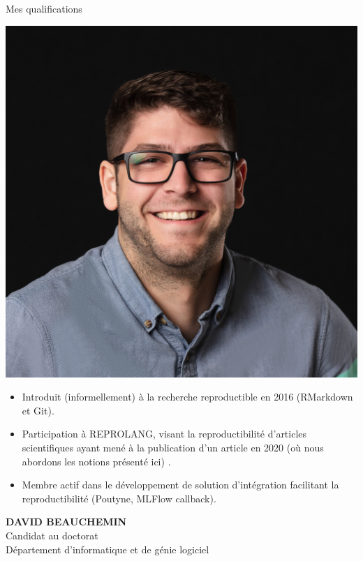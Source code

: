 \documentclass{beamer}
\begin{document}
	\begin{frame}{Mes qualifications}
		\begin{minipage}{0.25\linewidth}
			\includegraphics[width=\linewidth,keepaspectratio]{david.jpg}
		\end{minipage}
		\hfill
		\begin{minipage}{0.70\linewidth}
		\begin{itemize}
			\item Introduit (informellement) à la recherche reproductible en 2016 (RMarkdown et Git).
			\item Participation à REPROLANG, visant la reproductibilité d'articles scientifiques ayant mené à la publication d'un article en 2020 (où nous abordons les notions présenté ici) \cite{garneau2020robust}.
			\item Membre actif dans le développement de solution d'intégration facilitant la reproductibilité (Poutyne, MLFlow callback).
		\end{itemize}
	  \end{minipage}
	
	\begin{minipage}{0.25\linewidth}
	\small
	\textbf{DAVID BEAUCHEMIN} \\
	Candidat au doctorat \\
	Département d'informatique et de génie logiciel
	\end{minipage}
	\end{frame}
	
\end{document}
